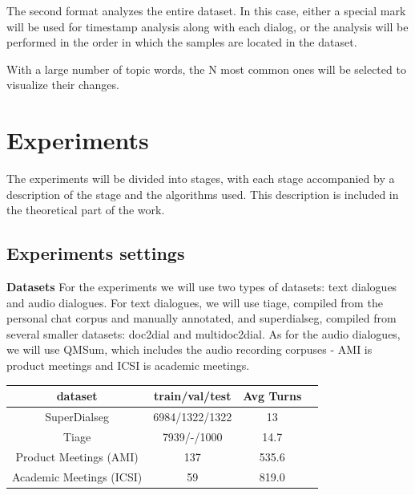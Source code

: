 \documentclass[PMI,VKR]{HSEUniversity}
\begin{document}
The second format analyzes the entire dataset. 
In this case, either a special mark will be used for timestamp analysis along with each dialog, or the analysis will be performed in the order in which the samples are located in the dataset.

With a large number of topic words, the N most common ones will be selected to visualize their changes.

\chapter{Experiments}

The experiments will be divided into stages, with each stage accompanied by a description of the stage and the algorithms used. 
This description is included in the theoretical part of the work.

\section{Experiments settings}

\textbf{Datasets}
For the experiments we will use two types of datasets: text dialogues and audio dialogues. 
For text dialogues, we will use tiage, compiled from the personal chat corpus and manually annotated, and superdialseg, compiled from several smaller datasets: doc2dial and multidoc2dial. 
As for the audio dialogues, we will use QMSum, which includes the audio recording corpuses - AMI is product meetings and ICSI is academic meetings. \\

\begin{table}[htb]
    \begin{center}
        \begin{tabular}{ | c | c | c | c |} 
            \hline
            dataset & train/val/test & Avg Turns \\ 
            \hline
            SuperDialseg & 6984/1322/1322 & 13  \\ 
            Tiage &  7939/-/1000 & 14.7 \\ 
            \hline
            Product Meetings (AMI) & 137 & 535.6 \\ 
            Academic Meetings (ICSI) & 59 & 819.0 \\
            \hline
        \end{tabular}
    \end{center}
\end{table}
\end{document}
